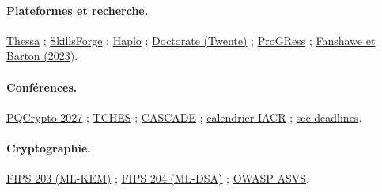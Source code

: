\documentclass[11pt,a4paper]{article}
\begin{document}
\paragraph{Plateformes et recherche.}
\href{https://studies.helsinki.fi/instructions/article/thessa}{Thessa} ;
\href{https://skillsforge.net}{SkillsForge} ;
\href{https://www.haplo.com/phd-manager}{Haplo} ;
\href{https://www.utwente.nl/en/service-portal/research-support/phd-engd-programmes-tgs/doctorate-phdengd-monitoring-system}{Doctorate (Twente)} ;
\href{https://hsd.ardascience.com/index.php/journal/article/download/1623/264/5253}{ProGRess} ;
\href{https://ajet.org.au/index.php/AJET/article/download/8615/2025/30010}{Fanshawe et Barton (2023)}.

\paragraph{Conférences.}
\href{https://easychair.org/cfp/pqcrypto2027}{PQCrypto 2027} ;
\href{https://tches.iacr.org/index.php/TCHES/submission}{TCHES} ;
\href{https://gdr-securite.irisa.fr/evenement/cascade-2025}{CASCADE} ;
\href{https://www.iacr.org/events/eventsbysubmission.php4}{calendrier IACR} ;
\href{https://sec-deadlines.github.io}{sec-deadlines}.

\paragraph{Cryptographie.}
\href{https://csrc.nist.gov/pubs/fips/203/final}{FIPS 203 (ML-KEM)} ;
\href{https://csrc.nist.gov/pubs/fips/204/final}{FIPS 204 (ML-DSA)} ;
\href{https://owasp.org/www-project-application-security-verification-standard/}{OWASP ASVS}.
\end{document}

